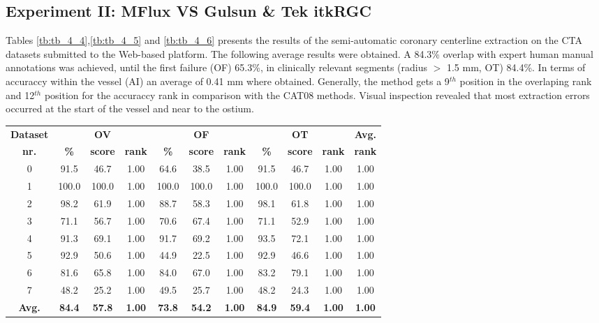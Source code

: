 \subsection{Experiment II: MFlux VS Gulsun \& Tek itkRGC}

Tables \ref{tb:tb_4_4},\ref{tb:tb_4_5} and \ref{tb:tb_4_6}  presents the results of the semi-automatic coronary centerline extraction on the CTA datasets submitted to the Web-based platform. The following average results were obtained. A 84.3\% overlap with expert human manual annotations was achieved, until the first failure (OF) 65.3\%, in clinically relevant segments (radius $>$ 1.5 mm, OT) 84.4\%. In terms of accuraccy within the vessel (AI) an average of 0.41 mm where obtained. Generally, the method gets a 9$^{th}$ position in the overlaping rank and 12$^{th}$ position for the accuraccy rank in comparison with the CAT08 methods. Visual inspection revealed that most extraction errors occurred at the start of the vessel and near to the ostium.

\begin{table*}
\scriptsize
\caption{G \& T average overlap per dataset}
\centering
\begin{tabular}{|c|ccc|ccc|ccc|c|}
\hline
\multicolumn{1}{|c|}{\textbf{Dataset}} &\multicolumn{3}{c|}{\textbf{OV}} &\multicolumn{3}{c|}{\textbf{OF}} &\multicolumn{3}{c|}{\textbf{OT}} &\multicolumn{1}{c|}{\textbf{Avg.}} \\
\multicolumn{1}{|c|}{\textbf{nr.}} &\multicolumn{1}{c|}{\textbf{\%}} &\multicolumn{1}{c|}{\textbf{score}} &\multicolumn{1}{c|}{\textbf{rank}} &\multicolumn{1}{c|}{\textbf{\%}} &\multicolumn{1}{c|}{\textbf{score}} &\multicolumn{1}{c|}{\textbf{rank}} &\multicolumn{1}{c|}{\textbf{\%}} &\multicolumn{1}{c|}{\textbf{score}} &\multicolumn{1}{c|}{\textbf{rank}} &\multicolumn{1}{c|}{\textbf{rank}}\\
\hline
0&91.5&46.7& 1.00&64.6&38.5& 1.00&91.5&46.7& 1.00& 1.00\\
1&100.0&100.0& 1.00&100.0&100.0& 1.00&100.0&100.0& 1.00& 1.00\\
2&98.2&61.9& 1.00&88.7&58.3& 1.00&98.1&61.8& 1.00& 1.00\\
3&71.1&56.7& 1.00&70.6&67.4& 1.00&71.1&52.9& 1.00& 1.00\\
4&91.3&69.1& 1.00&91.7&69.2& 1.00&93.5&72.1& 1.00& 1.00\\
5&92.9&50.6& 1.00&44.9&22.5& 1.00&92.9&46.6& 1.00& 1.00\\
6&81.6&65.8& 1.00&84.0&67.0& 1.00&83.2&79.1& 1.00& 1.00\\
7&48.2&25.2& 1.00&49.5&25.7& 1.00&48.2&24.3& 1.00& 1.00\\
\hline
\textbf{Avg.}&\textbf{84.4}&\textbf{57.8}&\textbf{ 1.00}&\textbf{73.8}&\textbf{54.2}&\textbf{ 1.00}&\textbf{84.9}&\textbf{59.4}&\textbf{ 1.00}&\textbf{ 1.00}\\
\hline
\end{tabular}
\vspace{-0.3cm}
\label{tb:tb_4_4}
\normalsize
\end{table*}

